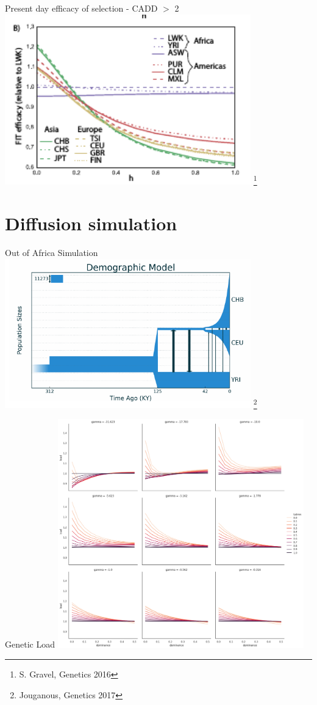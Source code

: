 \documentclass[10pt]{beamer}
\begin{document}
\begin{frame}{\normalsize Present day efficacy
    of selection - CADD $>$ 2} 
  \vfill
  \centering
  \includegraphics[width=0.8\textwidth]{./Figures/Gravel_efsel_CADD.png}
  \let\thefootnote\relax\footnote{S. Gravel, Genetics 2016}
\end{frame}

\section{Diffusion simulation}
\begin{frame}[t]{Out of Africa Simulation}
  \vfill
  \centering
  \includegraphics[width=0.8\textwidth]{./Figures/moments_simul.png}
  \let\thefootnote\relax\footnote{Jouganous, Genetics 2017}
\end{frame}

\begin{frame}[t]{Genetic Load}
  \vfill
  \centering
  \includegraphics[width=0.8\textwidth]{./Figures/load.png}
\end{frame}
\end{document}
